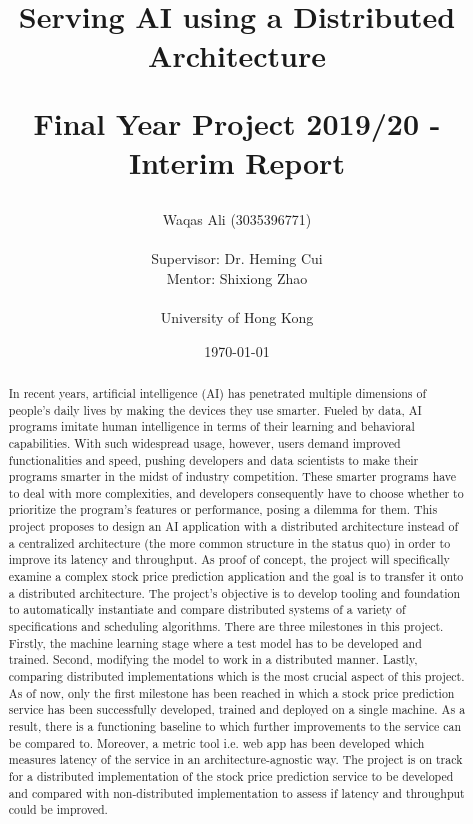 \documentclass{report}
\title{
  Serving AI using a Distributed Architecture \\ 
\begin{large} 
  Final Year Project 2019/20 - Interim Report
\end{large} }
\author{Waqas Ali (3035396771)\\\\Supervisor: Dr. Heming Cui\\Mentor: Shixiong Zhao\\\\University of Hong Kong}
\date{\today}
\def\frontmatter{%
    \pagenumbering{roman}
    \setcounter{page}{1}
    \renewcommand{\thesection}{\Roman{section}}
}%
\begin{document}
\maketitle

\frontmatter

\begin{abstract}
\thispagestyle{plain}

In recent years, artificial intelligence (AI) has penetrated multiple dimensions of people's daily lives by making the devices they use smarter.
Fueled by data, AI programs imitate human intelligence in terms of their learning and behavioral capabilities.
With such widespread usage, however, users demand improved functionalities and speed, pushing developers and data scientists to make their programs smarter in the midst of industry competition.
These smarter programs have to deal with more complexities, and developers consequently have to choose whether to prioritize the program's features or performance, posing a dilemma for them.
This project proposes to design an AI application with a distributed architecture instead of a centralized architecture (the more common structure in the status quo) in order to improve its latency and throughput.
As proof of concept, the project will specifically examine a complex stock price prediction application and the goal is to transfer it onto a distributed architecture.
The project's objective is to develop tooling and foundation to automatically instantiate and compare distributed systems of a variety of specifications and scheduling algorithms.
There are three milestones in this project.
Firstly, the machine learning stage where a test model has to be developed and trained.
Second, modifying the model to work in a distributed manner.
Lastly, comparing distributed implementations which is the most crucial aspect of this project.
As of now, only the first milestone has been reached in which a stock price prediction service has been successfully developed, trained and deployed on a single machine.
As a result, there is a functioning baseline to which further improvements to the service can be compared to.
Moreover, a metric tool i.e. web app has been developed which measures latency of the service in an architecture-agnostic way.
The project is on track for a distributed implementation of the stock price prediction service to be developed and compared with non-distributed implementation to assess if latency and throughput could be improved.
\end{abstract}
\end{document}
